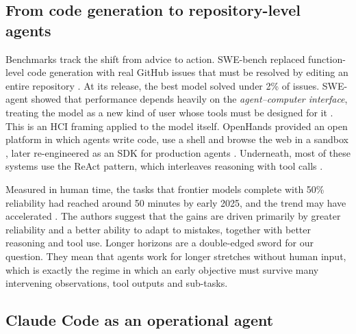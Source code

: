 \subsection{From code generation to repository-level agents}

Benchmarks track the shift from advice to action. SWE-bench replaced function-level code generation
with real GitHub issues that must be resolved by editing an entire repository \citep{jimenez2024swebench}.
At its release, the best model solved under 2\% of issues. SWE-agent showed that performance depends
heavily on the \emph{agent--computer interface}, treating the model as a new kind of user whose tools
must be designed for it \citep{yang2024sweagent}. This is an HCI framing applied to the model itself.
OpenHands provided an open platform in which agents write code, use a shell and browse the web in a
sandbox \citep{wang2024openhands}, later re-engineered as an SDK for production agents
\citep{wang2025openhandssdk}. Underneath, most of these systems use the ReAct pattern, which
interleaves reasoning with tool calls \citep{yao2023react}.

Measured in human time, the tasks that frontier models complete with 50\% reliability had reached
around 50 minutes by early 2025, and the trend may have accelerated \citep{kwa2025measuring}. The
authors suggest that the gains are driven primarily by greater reliability and a better ability to
adapt to mistakes, together with better reasoning and tool use. Longer horizons are a
double-edged sword for our question. They mean that agents work for longer stretches without human
input, which is exactly the regime in which an early objective must survive many intervening
observations, tool outputs and sub-tasks.

\subsection{Claude Code as an operational agent}
\label{sec:claudecode}

